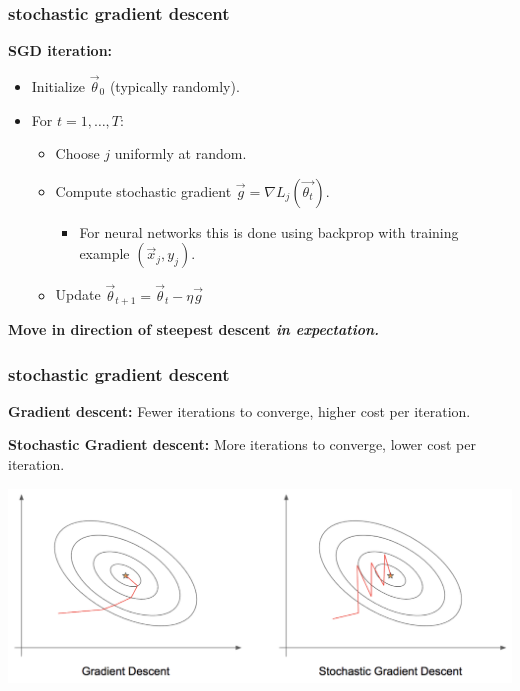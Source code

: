 \documentclass[handout,compress]{beamer}
\begin{document}
\begin{frame}
	\frametitle{stochastic gradient descent}
	\textbf{SGD iteration:}
	\begin{itemize}
		\item Initialize $\vec{\theta}_0$ (typically randomly).
		\item For $t = 1, \ldots, T$:
		\begin{itemize}
			\item Choose $j$ uniformly at random.
			\item Compute stochastic gradient $\vec{g} = \nabla L_j(\vec{\theta_t})$.
			\begin{itemize}
				\item For neural networks this is done using backprop with training example $(\vec{x}_j, y_j)$. 
			\end{itemize}
			\item Update $\vec{\theta}_{t+1} = \vec{\theta}_{t} - \eta \vec{g}$
		\end{itemize}
	\end{itemize}
\begin{center}
	\textbf{\alert{Move in direction of steepest descent \emph{in expectation.}}}
\end{center}
\end{frame}

\begin{frame}
	\frametitle{stochastic gradient descent}
	\textbf{Gradient descent:} Fewer iterations to converge, higher cost per iteration.
	
	\textbf{Stochastic Gradient descent:} More iterations to converge, lower cost per iteration.
	
	\begin{center}
		\includegraphics[width=\textwidth]{sgd_path_tame.png}
	\end{center}
\end{frame}
\end{document}
